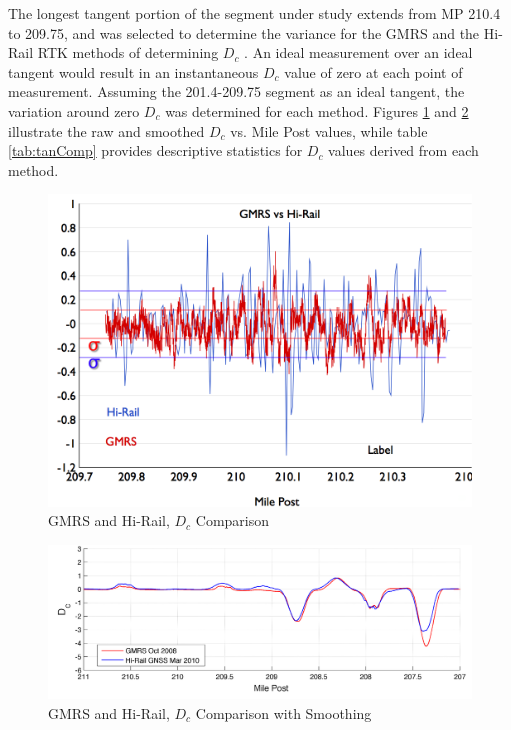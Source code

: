 The longest tangent portion of the segment under study extends from MP 210.4 to 209.75, and was selected to determine the variance for the GMRS and the Hi-Rail RTK methods of determining $D_c$ . An ideal measurement over an ideal tangent would result in an instantaneous $D_c$ value of zero at each point of measurement. Assuming the 201.4-209.75 segment as an ideal tangent, the variation around zero $D_c$ was determined for each method. Figures \ref{fig:gmrsVShirail} and \ref{fig:gmrs_HiRail} illustrate the raw and smoothed $D_c$ vs. Mile Post values, while table \ref{tab:tanComp} provides descriptive statistics for $D_c$ values derived from each method. 

\begin{figure}[!h]
	\begin{center}
	\includegraphics[scale=0.35]{graphics/HiRailVTGC}
	\caption{GMRS and Hi-Rail, $D_c$ Comparison}
	\label{fig:gmrsVShirail}
	\end{center}
\end{figure}

\begin{figure}[!h]
	\begin{center}
	\includegraphics[scale=0.60]{graphics/GMRS_HiRail}
	\caption{GMRS and Hi-Rail, $D_c$ Comparison with Smoothing}
	\label{fig:gmrs_HiRail}
	\end{center}
\end{figure}

